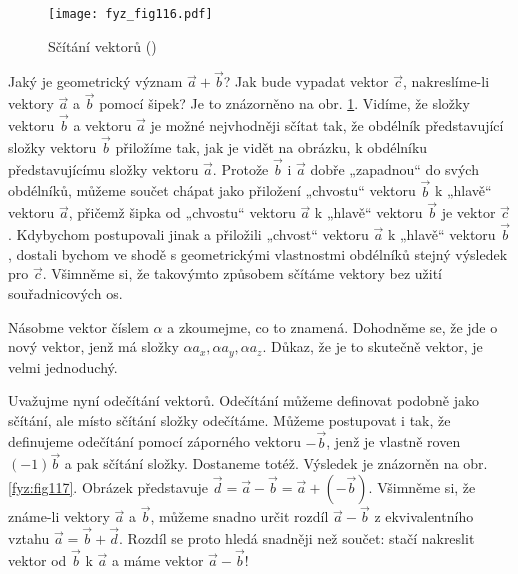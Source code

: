     \begin{figure}[ht!]  %
      \centering
      \texttt{[image: fyz\_fig116.pdf]}
      \caption{Sčítání vektorů
              (\cite[s.~160]{Feynman01})}
      \label{fyz:fig116}
    \end{figure}
    Jaký je geometrický význam \(\vec{a} + \vec{b}\)? Jak bude vypadat vektor \(\vec{c}\), 
    nakreslíme-li vektory \(\vec{a}\) a \(\vec{b}\) pomocí šipek? Je to znázorněno na obr. 
    \ref{fyz:fig116}. Vidíme, že složky vektoru \(\vec{b}\) a vektoru \(\vec{a}\) je možné 
    nejvhodněji sčítat tak, že obdélník představující složky vektoru \(\vec{b}\) přiložíme tak, jak 
    je vidět na obrázku, k obdélníku představujícímu složky vektoru \(\vec{a}\). Protože 
    \(\vec{b}\) i \(\vec{a}\) dobře „zapadnou“ do svých obdélníků, můžeme součet chápat jako 
    přiložení „chvostu“ vektoru \(\vec{b}\) k „hlavě“ vektoru \(\vec{a}\), přičemž šipka od 
    „chvostu“ vektoru \(\vec{a}\) k „hlavě“ vektoru \(\vec{b}\) je vektor \(\vec{c}\). Kdybychom 
    postupovali jinak a přiložili „chvost“ vektoru \(\vec{a}\) k „hlavě“ vektoru \(\vec{b}\), 
    dostali bychom ve shodě s geometrickými vlastnostmi obdélníků stejný výsledek pro \(\vec{c}\). 
    Všimněme si, že takovýmto způsobem sčítáme vektory bez užití souřadnicových os.
    
    Násobme vektor číslem \(\alpha\) a zkoumejme, co to znamená. Dohodněme se, že jde o nový 
    vektor, jenž má složky \(\alpha a_x, \alpha a_y, \alpha a_z\). Důkaz, že je to skutečně vektor, 
    je velmi jednoduchý.
    
    Uvažujme nyní odečítání vektorů. Odečítání můžeme definovat podobně jako sčítání, ale místo 
    sčítání složky odečítáme. Můžeme postupovat i tak, že definujeme odečítání pomocí záporného 
    vektoru \(-\vec{b}\), jenž je vlastně roven \((-1)\vec{b}\) a pak sčítání složky. Dostaneme 
    totéž. Výsledek je znázorněn na obr. \ref{fyz:fig117}. Obrázek představuje \(\vec{d} = \vec{a} 
    - \vec{b} = \vec{a} + (-\vec{b})\). Všimněme si, že známe-li vektory \(\vec{a}\) a \(\vec{b}\), 
    můžeme snadno určit rozdíl \(\vec{a} - \vec{b}\) z ekvivalentního vztahu \(\vec{a} = \vec{b} + 
    \vec{d}\). Rozdíl se proto hledá snadněji než součet: stačí nakreslit vektor od \(\vec{b}\) k 
    \(\vec{a}\) a máme vektor \(\vec{a} - \vec{b}\)!
    

